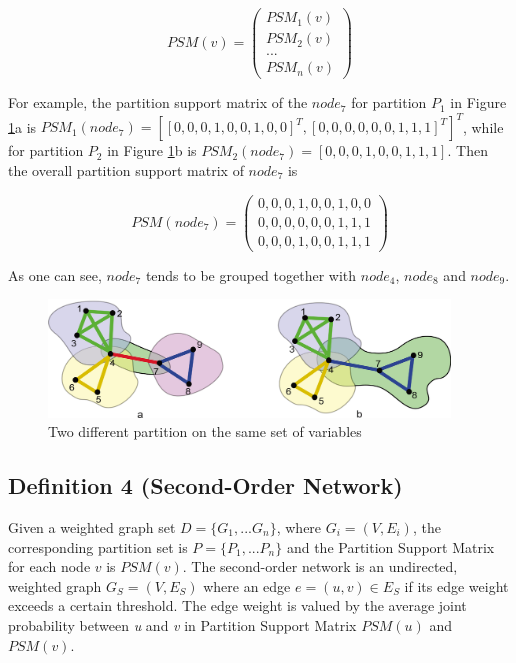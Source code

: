\begin{equation}
PSM(v)=
\left(\begin{array}{c}
PSM_{1}(v) \\
PSM_{2}(v) \\
...        \\
PSM_{n}(v)
\end{array}\right)
\nonumber
\end{equation}

For example, the partition support matrix of the $node_{7}$ for partition $P_{1}$ in Figure \ref{fig:psm}a is $PSM_{1}(node_{7})=[[0,0,0,1,0,0,1,0,0]^T, [0,0,0,0,0,0,1,1,1]^T]^T$, while for partition $P_{2}$ in Figure \ref{fig:psm}b is $PSM_{2}(node_{7})=[0,0,0,1,0,0,1,1,1]$. Then the overall partition support matrix of $node_{7}$ is

\begin{equation}
PSM(node_{7})=
\left(\begin{array}{c}
0,0,0,1,0,0,1,0,0 \\
0,0,0,0,0,0,1,1,1 \\
0,0,0,1,0,0,1,1,1
\end{array}\right)
\nonumber
\end{equation}

 As one can see, $node_{7}$ tends to be grouped together with $node_{4}$, $node_{8}$ and $node_{9}$.


\begin{figure}
\centering
\includegraphics[width=0.95\textwidth]{PSM.pdf}
\caption{Two different partition on the same set of variables}
\label{fig:psm}
\end{figure}


\subsection{Definition 4 (Second-Order Network)}
Given a weighted graph set $D=\{G_{1},...G_{n}\}$, where $G_{i}=(V,E_{i})$, the corresponding partition set is $P=\{P_{1},...P_{n}\}$ and
the Partition Support Matrix for each node $v$ is $PSM(v)$. The second-order network is an undirected, weighted graph
$G_{S}=(V,E_{S})$ where an edge $e=(u,v) \in E_{S}$ if its edge weight exceeds a certain threshold. The edge weight is valued by the average joint probability between \emph{u} and \emph{v} in Partition Support Matrix $PSM(u)$ and $PSM(v)$.

